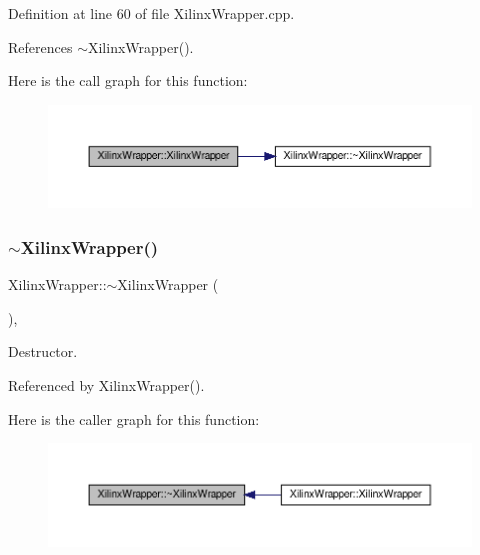 Definition at line 60 of file Xilinx\+Wrapper.\+cpp.



References $\sim$\+Xilinx\+Wrapper().

Here is the call graph for this function\+:
\nopagebreak
\begin{figure}[H]
\begin{center}
\leavevmode
\includegraphics[width=350pt]{d4/da0/classXilinxWrapper_ab6102041bdfe5263be75e5d65685ccc2_cgraph}
\end{center}
\end{figure}
\mbox{\label{classXilinxWrapper_a49cac83ef2023618b5007e35ef589a32}} 
\subsubsection{\texorpdfstring{$\sim$\+Xilinx\+Wrapper()}{~XilinxWrapper()}}
{\footnotesize\ttfamily Xilinx\+Wrapper\+::$\sim$\+Xilinx\+Wrapper (\begin{DoxyParamCaption}{ }\end{DoxyParamCaption})\hspace{0.3cm}{\ttfamily [override]}, {\ttfamily [default]}}



Destructor. 



Referenced by Xilinx\+Wrapper().

Here is the caller graph for this function\+:
\nopagebreak
\begin{figure}[H]
\begin{center}
\leavevmode
\includegraphics[width=350pt]{d4/da0/classXilinxWrapper_a49cac83ef2023618b5007e35ef589a32_icgraph}
\end{center}
\end{figure}



